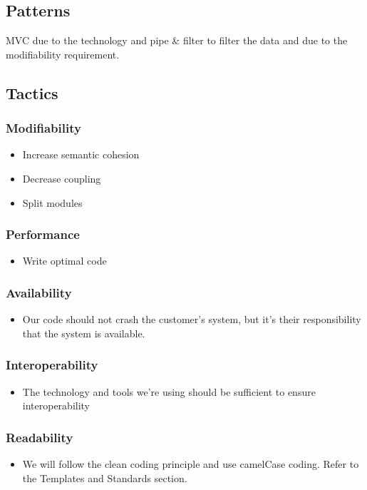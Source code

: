 \subsection{Patterns}
MVC due to the technology and pipe \&  filter to filter the data and due to the modifiability requirement.
\subsection{Tactics}
\subsubsection{Modifiability}
\begin{itemize}
\item Increase semantic cohesion
\item Decrease coupling
\item Split modules
\end{itemize}

\subsubsection{Performance}
\begin{itemize}
\item Write optimal code
\end{itemize}

\subsubsection{Availability}
\begin{itemize}
\item Our code should not crash the customer's system, but it's their responsibility that the system is available.
\end{itemize}

\subsubsection{Interoperability}
\begin{itemize}
\item The technology and tools we're using should be sufficient to ensure interoperability
\end{itemize}

\subsubsection{Readability}
\begin{itemize}
\item We will follow the clean coding principle and use camelCase coding. Refer to the Templates and Standards section.
\end{itemize}